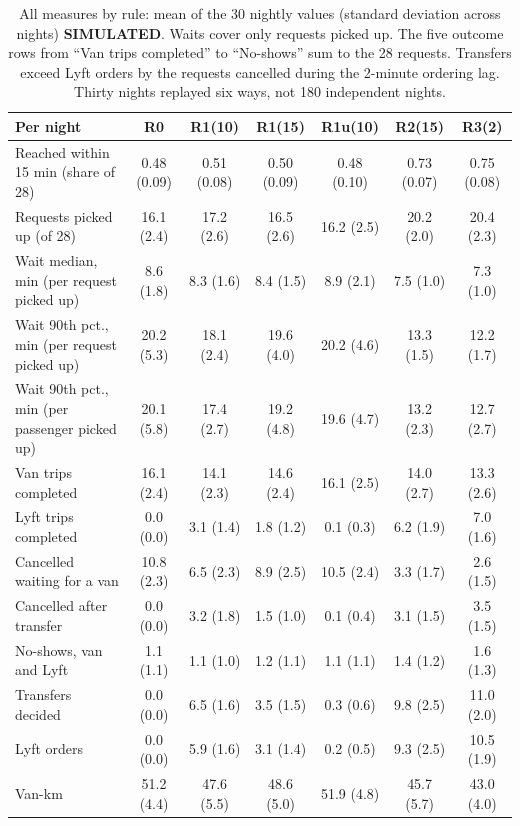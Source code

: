 \documentclass{article}
\newcommand{\lab}[1]{{\footnotesize\textsf{\textbf{#1}}}}
\newcommand{\SIM}{\lab{SIMULATED}}
\begin{document}
\begin{table}[t]
\centering\small
\caption{All measures by rule: mean of the 30 nightly values (standard deviation across nights) \SIM. Waits cover only requests picked up. The five outcome rows from ``Van trips completed'' to ``No-shows'' sum to the 28 requests. Transfers exceed Lyft orders by the requests cancelled during the 2-minute ordering lag. Thirty nights replayed six ways, not 180 independent nights.}\label{tab:metrics}
\begin{tabularx}{\textwidth}{@{}Lcccccc@{}}
\toprule
\textbf{Per night} & \textbf{R0} & \textbf{R1(10)} & \textbf{R1(15)} & \textbf{R1u(10)} & \textbf{R2(15)} & \textbf{R3(2)}\\
\midrule
Reached within 15 min (share of 28) & 0.48 (0.09) & 0.51 (0.08) & 0.50 (0.09) & 0.48 (0.10) & 0.73 (0.07) & 0.75 (0.08)\\
Requests picked up (of 28) & 16.1 (2.4) & 17.2 (2.6) & 16.5 (2.6) & 16.2 (2.5) & 20.2 (2.0) & 20.4 (2.3)\\
Wait median, min (per request picked up) & 8.6 (1.8) & 8.3 (1.6) & 8.4 (1.5) & 8.9 (2.1) & 7.5 (1.0) & 7.3 (1.0)\\
Wait 90th pct., min (per request picked up) & 20.2 (5.3) & 18.1 (2.4) & 19.6 (4.0) & 20.2 (4.6) & 13.3 (1.5) & 12.2 (1.7)\\
Wait 90th pct., min (per passenger picked up) & 20.1 (5.8) & 17.4 (2.7) & 19.2 (4.8) & 19.6 (4.7) & 13.2 (2.3) & 12.7 (2.7)\\
Van trips completed & 16.1 (2.4) & 14.1 (2.3) & 14.6 (2.4) & 16.1 (2.5) & 14.0 (2.7) & 13.3 (2.6)\\
Lyft trips completed & 0.0 (0.0) & 3.1 (1.4) & 1.8 (1.2) & 0.1 (0.3) & 6.2 (1.9) & 7.0 (1.6)\\
Cancelled waiting for a van & 10.8 (2.3) & 6.5 (2.3) & 8.9 (2.5) & 10.5 (2.4) & 3.3 (1.7) & 2.6 (1.5)\\
Cancelled after transfer & 0.0 (0.0) & 3.2 (1.8) & 1.5 (1.0) & 0.1 (0.4) & 3.1 (1.5) & 3.5 (1.5)\\
No-shows, van and Lyft & 1.1 (1.1) & 1.1 (1.0) & 1.2 (1.1) & 1.1 (1.1) & 1.4 (1.2) & 1.6 (1.3)\\
\midrule
Transfers decided & 0.0 (0.0) & 6.5 (1.6) & 3.5 (1.5) & 0.3 (0.6) & 9.8 (2.5) & 11.0 (2.0)\\
Lyft orders & 0.0 (0.0) & 5.9 (1.6) & 3.1 (1.4) & 0.2 (0.5) & 9.3 (2.5) & 10.5 (1.9)\\
Van-km & 51.2 (4.4) & 47.6 (5.5) & 48.6 (5.0) & 51.9 (4.8) & 45.7 (5.7) & 43.0 (4.0)\\
\bottomrule
\end{tabularx}
\end{table}
\end{document}
